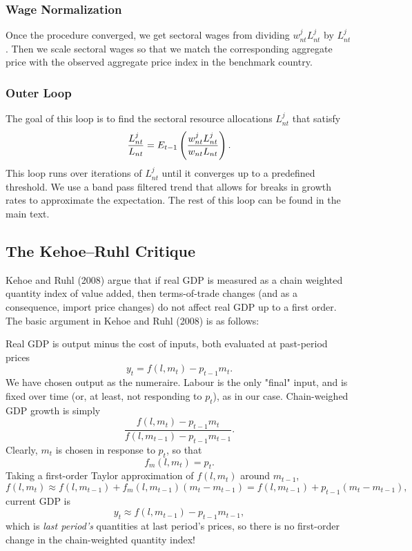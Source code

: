 \documentclass[12pt]{article}
\begin{document}
\subsubsection{Wage Normalization}

Once the procedure converged, we get sectoral wages from dividing $w_{nt}^j
L_{nt}^j$ by $L_{nt}^j$. Then we scale sectoral wages so that we match the
corresponding aggregate price with the observed aggregate price index in the
benchmark country.

\subsubsection{Outer Loop}

The goal of this loop is to find the sectoral resource allocations $%
L_{nt}^{j}$ that satisfy 
\begin{equation*}
\frac{L_{nt}^{j}}{L_{nt}}=E_{t-1}\left( \frac{w_{nt}^{j}L_{nt}^{j}}{%
w_{nt}L_{nt}}\right) .
\end{equation*}%
This loop runs over iterations of $L_{nt}^{j}$ until it converges up to a
predefined threshold. We use a band pass filtered trend that allows for
breaks in growth rates to approximate the expectation. The rest of this loop
can be found in the main text.

\subsection{The Kehoe--Ruhl Critique}

Kehoe and Ruhl (2008) argue that if real GDP is measured as a chain weighted
quantity index of value added, then terms-of-trade changes (and as a
consequence, import price changes) do not affect real GDP up to a first
order. The basic argument in Kehoe and Ruhl (2008) is as follows:

Real GDP is output minus the cost of inputs, both evaluated at past-period
prices 
\begin{equation*}
y_{t}=f(l,m_{t})-p_{t-1}m_{t}.
\end{equation*}%
We have chosen output as the numeraire. Labour is the only "final" input,
and is fixed over time (or, at least, not responding to $p_{t}$), as in our
case. Chain-weighed GDP growth is simply 
\begin{equation*}
\frac{f(l,m_{t})-p_{t-1}m_{t}}{f(l,m_{t-1})-p_{t-1}m_{t-1}}.
\end{equation*}%
Clearly, $m_{t}$ is chosen in response to $p_{t}$, so that 
\begin{equation*}
f_{m}(l,m_{t})=p_{t}.
\end{equation*}%
Taking a first-order Taylor approximation of $f(l,m_{t})$ around $m_{t-1}$, 
\begin{equation*}
f(l,m_{t})\approx
f(l,m_{t-1})+f_{m}(l,m_{t-1})(m_{t}-m_{t-1})=f(l,m_{t-1})+p_{t-1}(m_{t}-m_{t-1}),
\end{equation*}%
current GDP is 
\begin{equation*}
y_{t}\approx f(l,m_{t-1})-p_{t-1}m_{t-1},
\end{equation*}%
which is \emph{last period's} quantities at last period's prices, so there
is no first-order change in the chain-weighted quantity index!
\end{document}
